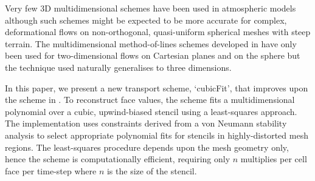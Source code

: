 Very few 3D multidimensional schemes have been used in atmospheric models \citep[e.g.]{gassmann2013} although such schemes might be expected to be more accurate for complex, deformational flows on non-orthogonal, quasi-uniform spherical meshes with steep terrain.  The multidimensional method-of-lines schemes developed in \citep{weller2009,weller-shahrokhi2014} have only been used for two-dimensional flows on Cartesian planes and on the sphere but the technique used naturally generalises to three dimensions.

In this paper, we present a new transport scheme, `cubicFit', that improves upon the scheme in \citep{weller-shahrokhi2014}.  To reconstruct face values, the scheme fits a multidimensional polynomial over a cubic, upwind-biased stencil using a least-squares approach.  The implementation uses constraints derived from a von Neumann stability analysis to select appropriate polynomial fits for stencils in highly-distorted mesh regions.  The least-squares procedure depends upon the mesh geometry only, hence the scheme is computationally efficient, requiring only $n$ multiplies per cell face per time-step where $n$ is the size of the stencil.






